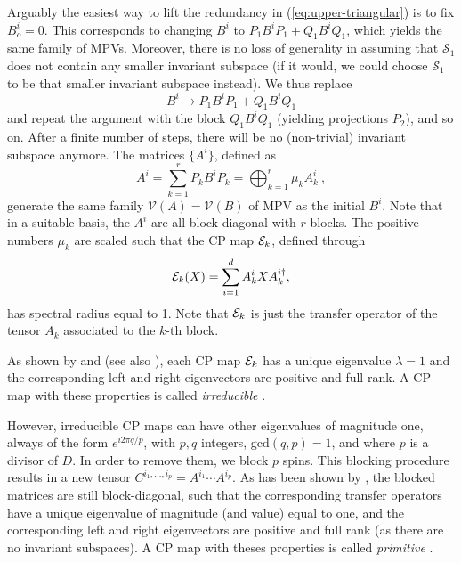 \documentclass[rmp,aps,reprint,superscriptaddress,nobalancelastpage]{revtex4-1}
\newcommand{\be}{\begin{equation}}
\newcommand{\ee}{\end{equation}}
\begin{document}
    Arguably the easiest way to lift the redundancy  in (\ref{eq:upper-triangular}) is to fix $B^i_o=0$. This corresponds to changing $B^i$ to $P_1B^iP_1+ Q_1B^iQ_1$, which yields the same family of MPVs.  Moreover, there is no loss of generality in assuming that $\mathcal S_1$ does not contain any smaller invariant subspace (if it would, we could choose $\mathcal S_1$ to be that smaller invariant subspace instead).  We thus replace
    \[
        B^i \to P_1B^iP_1+ Q_1B^iQ_1
    \]
    and repeat the argument with the block $Q_1B^iQ_1$ (yielding projections $P_2$), and so on.
    After a finite number of steps, there will be no (non-trivial) invariant subspace anymore. The matrices $\{A^i\}$, defined as
    \be
        \label{eq:II_Aiplusk1}
        A^i = \sum_{k=1}^r P_k B^i P_k = \bigoplus_{k=1}^r \mu_k A^i_k\ ,
    \ee
    generate the same family $\mathcal V(A)=\mathcal V(B)$ of MPV as the initial $B^i$. Note that in a suitable basis, the $A^i$ are all block-diagonal with $r$ blocks.  The positive numbers $\mu_k$ are scaled such that the CP map ${\cal E}_k$, defined through
    \be
        \label{Ek}
        {\cal E}_k (X) = \sum_{i=1}^d A_k^i X A_k^{i\dagger},
    \ee
    has spectral radius equal to 1. Note that ${\cal E}_k$ is just the transfer operator of  the tensor $A_k$  associated to the $k$-th block.

    As shown by \textcite{fannes:FCS} and \textcite{perez-garcia:mps-reps} (see also \textcite{wolf:channel-notes}), each CP map ${\cal E}_k$ has a unique eigenvalue $\lambda=1$ and the corresponding left and right eigenvectors are positive and full rank. A CP map with these properties is called {\it irreducible} \cite{wolf:channel-notes}.




    However, irreducible CP maps can have other eigenvalues of magnitude one,
    always of the form $e^{i 2\pi q/p}$, with $p,q$ integers, $\mathrm{gcd}(q,p)=1$,
    and where $p$ is a divisor of $D$. In order to remove them, we block
$p$ spins. This blocking procedure results in a new tensor $C^{i_1,\ldots, i_p}=A^{i_1}\cdots A^{i_p}$. As has been shown by \textcite{cadarso:fractionalization}, the blocked matrices are still block-diagonal, such that the  corresponding transfer operators have a unique eigenvalue of magnitude (and value)
    equal to one, and the corresponding left and right eigenvectors are
    positive and full rank (as there are no invariant subspaces). A CP map with theses properties is called {\it primitive} \cite{wolf:channel-notes}.
\end{document}
